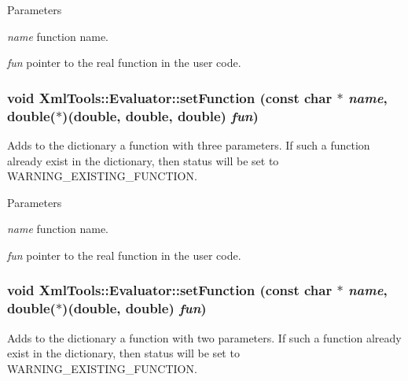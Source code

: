 \begin{DoxyParams}{Parameters}
\item[{\em name}]function name. \item[{\em fun}]pointer to the real function in the user code. \end{DoxyParams}
\hypertarget{class_xml_tools_1_1_evaluator_a40b7b86078c23765a6ab09636fece140}{
\subsubsection[{setFunction}]{\setlength{\rightskip}{0pt plus 5cm}void XmlTools::Evaluator::setFunction (const char $\ast$ {\em name}, \/  double($\ast$)(double, double, double) {\em fun})}}
\label{class_xml_tools_1_1_evaluator_a40b7b86078c23765a6ab09636fece140}
Adds to the dictionary a function with three parameters. If such a function already exist in the dictionary, then status will be set to WARNING\_\-EXISTING\_\-FUNCTION.


\begin{DoxyParams}{Parameters}
\item[{\em name}]function name. \item[{\em fun}]pointer to the real function in the user code. \end{DoxyParams}
\hypertarget{class_xml_tools_1_1_evaluator_a831f5dc1635829ad2b09e79ada885771}{
\subsubsection[{setFunction}]{\setlength{\rightskip}{0pt plus 5cm}void XmlTools::Evaluator::setFunction (const char $\ast$ {\em name}, \/  double($\ast$)(double, double) {\em fun})}}
\label{class_xml_tools_1_1_evaluator_a831f5dc1635829ad2b09e79ada885771}
Adds to the dictionary a function with two parameters. If such a function already exist in the dictionary, then status will be set to WARNING\_\-EXISTING\_\-FUNCTION.



